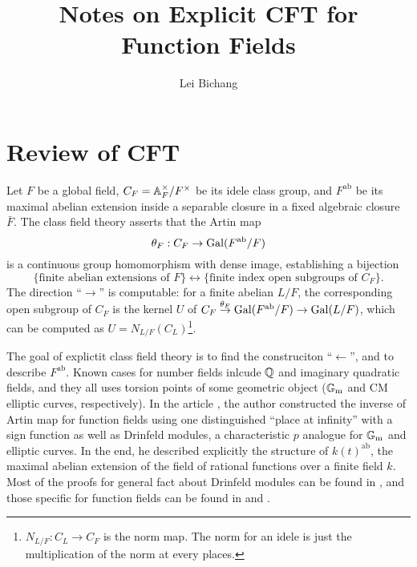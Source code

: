\documentclass{article}
\title{Notes on Explicit CFT for Function Fields}
\author{Lei Bichang}
\newcommand{\ab}{\mathrm{ab}}
\begin{document}
\maketitle

\section{Review of CFT}
Let $F$ be a global field, $C_F = \mathbb{A}_F^\times/F^\times$ be its idele class group, and $F^\ab$ be its maximal abelian extension inside a separable closure in a fixed algebraic closure $\bar F$.
The class field theory asserts that the Artin map
\[\theta_F : C_F\to\gal(F^\ab/F)\]
is a continuous group homomorphism with dense image,
establishing a bijection
\[\{\text{finite abelian extensions of }F\}\longleftrightarrow \{\text{finite index open subgroups of }C_F\}.\]
The direction ``$\to$'' is computable: for a finite abelian $L/F$,
the corresponding open subgroup of $C_F$ is the kernel $U$ of $C_F\stackrel{\theta_F}{\to}\gal(F^\ab/F)\to\gal(L/F)$,
which can be computed as $U = N_{L/F}(C_L)$\footnote{$N_{L/F} : C_L\to C_F$ is the norm map.
    The norm for an idele is just the multiplication of the norm at every places.}.

The goal of explictit class field theory is to find the construciton ``$\gets$'', and to describe $F^\ab$.
Known cases for number fields inlcude $\mathbb{Q}$ and imaginary quadratic fields, and they all uses torsion points of some geometric object (${\mathbb{G}_{\mathrm{m}}}$ and CM elliptic curves, respectively).
In the article \cite{zywina2011explicitclassfieldtheory}, the author constructed the inverse of Artin map for function fields using one distinguished ``place at infinity'' with a sign function as well as Drinfeld modules, a characteristic $p$ analogue for ${\mathbb{G}_{\mathrm{m}}}$ and elliptic curves.
In the end, he described explicitly the structure of $k(t)^\ab$, the maximal abelian extension of the field of rational functions over a finite field $k$.
Most of the proofs for general fact about Drinfeld modules can be found in \cite{goss2012basic}, and those specific for function fields can be found in \cite{Ha74} and \cite{zywina2011explicitclassfieldtheory}.
\end{document}
